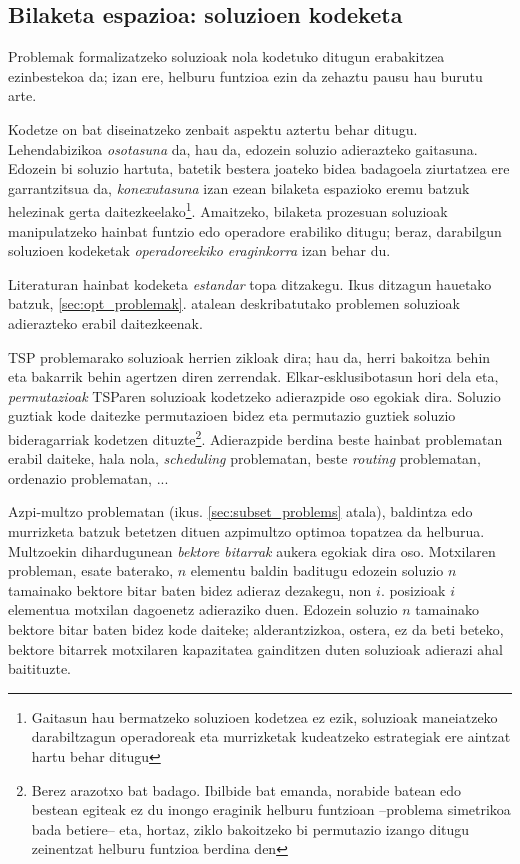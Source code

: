 \documentclass[eu]{ifirak}\usepackage[]{graphicx}\usepackage[]{color}
\begin{document}
\subsection{Bilaketa espazioa: soluzioen kodeketa}

Problemak formalizatzeko soluzioak nola kodetuko ditugun erabakitzea ezinbestekoa da; izan ere, helburu funtzioa ezin da zehaztu pausu hau burutu arte.

Kodetze on bat diseinatzeko zenbait aspektu aztertu behar ditugu. Lehendabizikoa \textit{osotasuna} da, hau da, edozein soluzio adierazteko gaitasuna. Edozein bi soluzio hartuta, batetik bestera joateko bidea badagoela ziurtatzea ere garrantzitsua da, \textit{konexutasuna} izan ezean bilaketa espazioko eremu batzuk helezinak gerta daitezkeelako\footnote{Gaitasun hau bermatzeko soluzioen kodetzea ez ezik, soluzioak maneiatzeko darabiltzagun operadoreak eta murrizketak kudeatzeko estrategiak ere aintzat hartu behar ditugu}. Amaitzeko, bilaketa prozesuan soluzioak manipulatzeko hainbat funtzio edo operadore erabiliko ditugu; beraz, darabilgun soluzioen kodeketak \textit{operadoreekiko eraginkorra} izan behar du.

Literaturan hainbat kodeketa \textit{estandar} topa ditzakegu. Ikus ditzagun hauetako batzuk, \ref{sec:opt_problemak}. atalean deskribatutako problemen soluzioak adierazteko erabil daitezkeenak.

TSP problemarako soluzioak herrien zikloak dira; hau da, herri bakoitza behin eta bakarrik behin agertzen diren zerrendak. Elkar-esklusibotasun hori dela eta, \textit{permutazioak} TSParen soluzioak kodetzeko adierazpide oso egokiak dira. Soluzio guztiak kode daitezke permutazioen bidez eta permutazio guztiek soluzio bideragarriak kodetzen dituzte\footnote{Berez arazotxo bat badago. Ibilbide bat emanda, norabide batean edo bestean egiteak ez du inongo eraginik helburu funtzioan --problema simetrikoa bada betiere-- eta, hortaz, ziklo bakoitzeko bi permutazio izango ditugu zeinentzat helburu funtzioa berdina den}. Adierazpide berdina beste hainbat problematan erabil daiteke, hala nola, \textit{scheduling} problematan, beste \textit{routing} problematan, ordenazio problematan, ... 

Azpi-multzo problematan (ikus. \ref{sec:subset_problems} atala), baldintza edo murrizketa batzuk betetzen dituen azpimultzo optimoa topatzea da helburua. Multzoekin dihardugunean \textit{bektore bitarrak} aukera egokiak dira oso. Motxilaren probleman, esate baterako, $n$ elementu baldin baditugu edozein soluzio $n$ tamainako bektore bitar baten bidez adieraz dezakegu, non $i$. posizioak $i$ elementua motxilan dagoenetz adieraziko duen. Edozein soluzio $n$ tamainako bektore bitar baten bidez kode daiteke; alderantzizkoa, ostera, ez da beti beteko, bektore bitarrek motxilaren kapazitatea gainditzen duten soluzioak adierazi ahal baitituzte.
\end{document}
